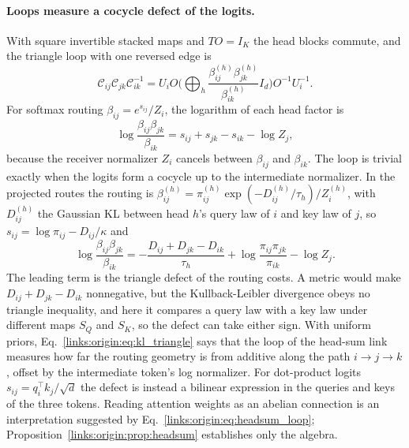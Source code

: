 \documentclass[11pt]{article}
\theoremstyle{definition}
\theoremstyle{remark}
\begin{document}
\paragraph{Loops measure a cocycle defect of the logits.}
With square invertible stacked maps and $TO=I_K$ the head blocks commute, and the triangle loop with one reversed edge is
\begin{equation}
\mathcal C_{ij}\mathcal C_{jk}\mathcal C_{ik}^{-1}
=U_iO\Big(\bigoplus_h\frac{\beta_{ij}^{(h)}\beta_{jk}^{(h)}}{\beta_{ik}^{(h)}}I_d\Big)O^{-1}U_i^{-1}.
\label{links:origin:eq:headsum_loop}
\end{equation}
For softmax routing $\beta_{ij}=e^{s_{ij}}/Z_i$, the logarithm of each head factor is
\begin{equation}
\log\frac{\beta_{ij}\beta_{jk}}{\beta_{ik}}=s_{ij}+s_{jk}-s_{ik}-\log Z_j,
\label{links:origin:eq:cocycle}
\end{equation}
because the receiver normalizer $Z_i$ cancels between $\beta_{ij}$ and $\beta_{ik}$. The loop is trivial exactly when the logits form a cocycle up to the intermediate normalizer. In the projected routes the routing is $\beta_{ij}^{(h)}=\pi_{ij}^{(h)}\exp(-D_{ij}^{(h)}/\tau_h)/Z_i^{(h)}$, with $D_{ij}^{(h)}$ the Gaussian KL between head $h$'s query law of $i$ and key law of $j$, so $s_{ij}=\log\pi_{ij}-D_{ij}/\kappa$ and
\begin{equation}
\log\frac{\beta_{ij}\beta_{jk}}{\beta_{ik}}=-\frac{D_{ij}+D_{jk}-D_{ik}}{\tau_h}+\log\frac{\pi_{ij}\pi_{jk}}{\pi_{ik}}-\log Z_j.
\label{links:origin:eq:kl_triangle}
\end{equation}
The leading term is the triangle defect of the routing costs. A metric would make $D_{ij}+D_{jk}-D_{ik}$ nonnegative, but the Kullback-Leibler divergence obeys no triangle inequality, and here it compares a query law with a key law under different maps $S_Q$ and $S_K$, so the defect can take either sign. With uniform priors, Eq.~\eqref{links:origin:eq:kl_triangle} says that the loop of the head-sum link measures how far the routing geometry is from additive along the path $i\to j\to k$, offset by the intermediate token's log normalizer. For dot-product logits $s_{ij}=q_i^\top k_j/\sqrt d$ the defect is instead a bilinear expression in the queries and keys of the three tokens. Reading attention weights as an abelian connection is an interpretation suggested by Eq.~\eqref{links:origin:eq:headsum_loop}; Proposition~\ref{links:origin:prop:headsum} establishes only the algebra.
\end{document}
